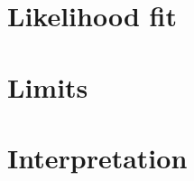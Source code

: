 \documentclass[../thesis.tex]{subfiles}
\begin{document}
\vspace{-1\baselineskip}

\section{Likelihood fit}
\label{sec:llh}
\section{Limits}
\label{sec:limits}
\section{Interpretation}
\label{sec:interpretation}
\end{document}
